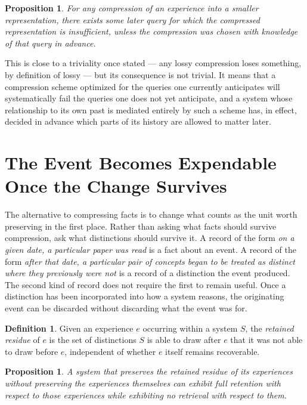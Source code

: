 \documentclass[11pt]{amsart}
\theoremstyle{plain}
\newtheorem{proposition}[theorem]{Proposition}
\theoremstyle{definition}
\newtheorem{definition}[theorem]{Definition}
\theoremstyle{remark}
\begin{document}
\begin{proposition}
\label{prop:compression-loss}
For any compression of an experience into a smaller representation,
there exists some later query for which the compressed representation
is insufficient, unless the compression was chosen with knowledge of
that query in advance.
\end{proposition}

This is close to a triviality once stated --- any lossy compression
loses something, by definition of lossy --- but its consequence is not
trivial. It means that a compression scheme optimized for the queries
one currently anticipates will systematically fail the queries one does
not yet anticipate, and a system whose relationship to its own past is
mediated entirely by such a scheme has, in effect, decided in advance
which parts of its history are allowed to matter later.

\section{The Event Becomes Expendable Once the Change Survives}

The alternative to compressing facts is to change what counts as the
unit worth preserving in the first place. Rather than asking what facts
should survive compression, ask what distinctions should survive it. A
record of the form \emph{on a given date, a particular paper was read}
is a fact about an event. A record of the form \emph{after that date, a
particular pair of concepts began to be treated as distinct where they
previously were not} is a record of a distinction the event produced.
The second kind of record does not require the first to remain useful.
Once a distinction has been incorporated into how a system reasons, the
originating event can be discarded without discarding what the event
was for.

\begin{definition}
Given an experience $e$ occurring within a system $S$, the
\emph{retained residue} of $e$ is the set of distinctions $S$ is able to
draw after $e$ that it was not able to draw before $e$, independent of
whether $e$ itself remains recoverable.
\end{definition}

\begin{proposition}
\label{prop:residue-sufficiency}
A system that preserves the retained residue of its experiences without
preserving the experiences themselves can exhibit full retention with
respect to those experiences while exhibiting no retrieval with respect
to them.
\end{proposition}
\end{document}

